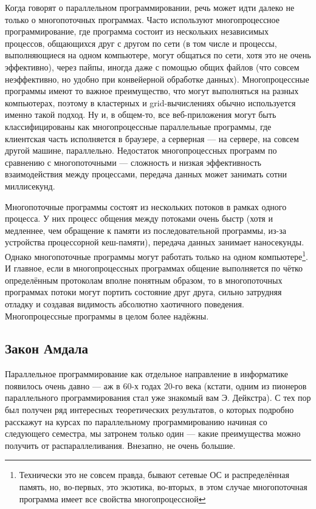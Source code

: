 \documentclass[a5paper]{article}
\begin{document}
Когда говорят о параллельном программировании, речь может идти далеко не только о многопоточных программах. Часто используют многопроцессное программирование, где программа состоит из нескольких независимых процессов, общающихся друг с другом по сети (в том числе и процессы, выполняющиеся на одном компьютере, могут общаться по сети, хотя это не очень эффективно), через пайпы, иногда даже с помощью общих файлов (что совсем неэффективно, но удобно при конвейерной обработке данных). Многопроцессные программы имеют то важное преимущество, что могут выполняться на разных компьютерах, поэтому в кластерных и grid-вычислениях обычно используется именно такой подход. Ну и, в общем-то, все веб-приложения могут быть классифицированы как многопроцессные параллельные программы, где клиентская часть исполняется в браузере, а серверная --- на сервере, на совсем другой машине, параллельно. Недостаток многопроцессных программ по сравнению с многопоточными --- сложность и низкая эффективность взаимодействия между процессами, передача данных может занимать сотни миллисекунд.

Многопоточные программы состоят из нескольких потоков в рамках одного процесса. У них процесс общения между потоками очень быстр (хотя и медленнее, чем обращение к памяти из последовательной программы, из-за устройства процессорной кеш-памяти), передача данных занимает наносекунды. Однако многопоточные программы могут работать только на одном компьютере\footnote{Технически это не совсем правда, бывают сетевые ОС и распределённая память, но, во-первых, это экзотика, во-вторых, в этом случае многопоточная программа имеет все свойства многопроцессной}. И главное, если в многопроцессных программах общение выполняется по чётко определённым протоколам вполне понятным образом, то в многопоточных программах потоки могут портить состояние друг друга, сильно затрудняя отладку и создавая видимость абсолютно хаотичного поведения. Многопроцессные программы в целом более надёжны.

\subsection{Закон Амдала}

Параллельное программирование как отдельное направление в информатике появилось очень давно --- аж в 60-х годах 20-го века (кстати, одним из пионеров параллельного программирования стал уже знакомый вам Э. Дейкстра). С тех пор был получен ряд интересных теоретических результатов, о которых подробно расскажут на курсах по параллельному программированию начиная со следующего семестра, мы затронем только один --- какие преимущества можно получить от распараллеливания. Внезапно, не очень большие.
\end{document}
